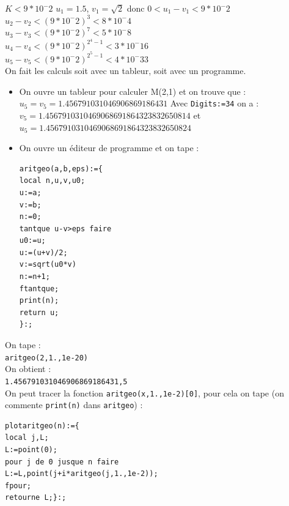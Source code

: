 \documentclass[a4paper,11pt]{book}
\begin{document}
$K<9*10^-2$
$u_1=1.5$, $v_1=\sqrt 2$ donc $0<u_1-v_1< 9*10^-2$\\
$u_2-v_2<(9*10^-2)^3<8*10^-4$\\
$u_3-v_3<(9*10^-2)^7<5*10^-8$\\
$u_4-v_4<(9*10^-2)^{2^4-1}<3*10^-{16}$\\
$u_5-v_5<(9*10^-2)^{2^5-1}<4*10^-{33}$\\
On fait les calculs soit avec un tableur, soit avec un programme.
\begin{itemize} 
\item On ouvre un tableur pour calculer M(2,1) et on trouve que :
$u_5=v_5=1.456791031046906869186431$
Avec {\tt Digits:=34} on a :\\
$v_5=1.4567910310469068691864323832650814$ et \\
$u_5=1.4567910310469068691864323832650824$
\item On ouvre un \'editeur de programme et on tape :
\begin{verbatim} 
aritgeo(a,b,eps):={
local n,u,v,u0;
u:=a;
v:=b;
n:=0;
tantque u-v>eps faire
u0:=u;
u:=(u+v)/2;
v:=sqrt(u0*v)
n:=n+1;
ftantque;
print(n);
return u;
}:;
\end{verbatim}
\end{itemize} 
On tape :\\
{\tt aritgeo(2,1.,1e-20)}\\
On obtient :\\
{\tt 1.456791031046906869186431,5}\\
On peut tracer la fonction {\tt aritgeo(x,1.,1e-2)[0]}, pour cela on tape (on 
commente {\tt print(n)} dans {\tt aritgeo}) :
\begin{verbatim} 
plotaritgeo(n):={
local j,L;
L:=point(0);
pour j de 0 jusque n faire
L:=L,point(j+i*aritgeo(j,1.,1e-2));
fpour;
retourne L;}:;
\end{verbatim}
\end{document}
